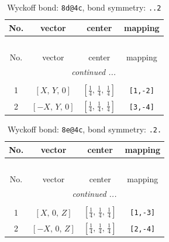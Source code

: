 \documentclass[fleqn,8pt]{jsarticle}
\begin{document}
\begin{longtable}{cccc}
\caption{Wyckoff bond: {\tt 8d@4c}, bond symmetry: {\tt ..2}}
 \\
 \hline \hline
No. & vector & center & mapping \\ \hline \endfirsthead

\multicolumn{3}{l}{\tablename\ \thetable{}} \\
 \hline \hline
No. & vector & center & mapping \\ \hline \endhead

 \hline \hline
\multicolumn{3}{r}{\footnotesize\it continued ...} \\ \endfoot

 \hline \hline
\multicolumn{3}{r}{} \\ \endlastfoot

1 & $\left[ X,\, Y,\, 0 \right]$ & $\left[ \frac{1}{4},\, \frac{1}{4},\, \frac{1}{4} \right]$ & {\tt [1,-2]} \\ \hline
2 & $\left[ - X,\, Y,\, 0 \right]$ & $\left[ \frac{1}{4},\, \frac{1}{4},\, \frac{1}{4} \right]$ & {\tt [3,-4]} \\
\end{longtable}
\renewcommand{\arraystretch}{1.2}
\begin{longtable}{cccc}
\caption{Wyckoff bond: {\tt 8e@4c}, bond symmetry: {\tt .2.}}
 \\
 \hline \hline
No. & vector & center & mapping \\ \hline \endfirsthead

\multicolumn{3}{l}{\tablename\ \thetable{}} \\
 \hline \hline
No. & vector & center & mapping \\ \hline \endhead

 \hline \hline
\multicolumn{3}{r}{\footnotesize\it continued ...} \\ \endfoot

 \hline \hline
\multicolumn{3}{r}{} \\ \endlastfoot

1 & $\left[ X,\, 0,\, Z \right]$ & $\left[ \frac{1}{4},\, \frac{1}{4},\, \frac{1}{4} \right]$ & {\tt [1,-3]} \\ \hline
2 & $\left[ - X,\, 0,\, Z \right]$ & $\left[ \frac{1}{4},\, \frac{1}{4},\, \frac{1}{4} \right]$ & {\tt [2,-4]} \\
\end{longtable}
\renewcommand{\arraystretch}{1.2}
\end{document}

